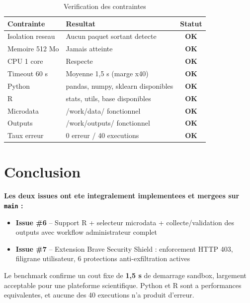 \documentclass[12pt,a4paper]{article}
\newcommand{\ok}{\textcolor{green!60!black}{\textbf{OK}}}
\begin{document}
\begin{table}[H]
\centering
\caption{Verification des contraintes}
\begin{tabularx}{\textwidth}{@{}lXc@{}}
\toprule
Contrainte & Resultat & Statut \\
\midrule
Isolation reseau  & Aucun paquet sortant detecte        & \ok \\
Memoire 512 Mo    & Jamais atteinte                     & \ok \\
CPU 1 core        & Respecte                            & \ok \\
Timeout 60 s      & Moyenne 1,5 s (marge x40)           & \ok \\
Python            & pandas, numpy, sklearn disponibles  & \ok \\
R                 & stats, utils, base disponibles      & \ok \\
Microdata         & /work/data/ fonctionnel             & \ok \\
Outputs           & /work/outputs/ fonctionnel          & \ok \\
Taux erreur       & 0 erreur / 40 executions            & \ok \\
\bottomrule
\end{tabularx}
\end{table}

\section{Conclusion}

\noindent\colorbox{green!8}{\parbox{\linewidth}{\vspace{6pt}
\textbf{Les deux issues ont ete integralement implementees et mergees sur \texttt{main} :}
\begin{itemize}
  \item \textbf{Issue \#6} -- Support R + selecteur microdata + collecte/validation des
        outputs avec workflow administrateur complet
  \item \textbf{Issue \#7} -- Extension Brave Security Shield : enforcement HTTP 403,
        filigrane utilisateur, 6 protections anti-exfiltration actives
\end{itemize}
\vspace{6pt}}}

\vspace{8pt}
Le benchmark confirme un cout fixe de \textbf{1,5 s} de demarrage sandbox, largement
acceptable pour une plateforme scientifique. Python et R sont a performances equivalentes,
et aucune des 40 executions n'a produit d'erreur.
\end{document}
